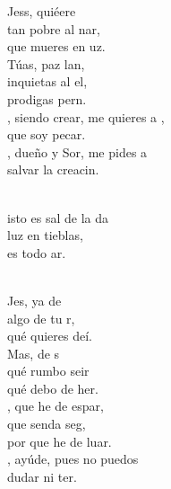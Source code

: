 \begin{cancion}%
	Jess, quiéere \\
	tan pobre al nar,\\
	que mueres en uz.\\
	Túas, paz  lan, \\
	inquietas al el,\\
	prodigas pern. \\
	, siendo crear, me quieres a , \\
	que soy pecar.\\
	, dueño y Sor, me pides a   \\
	salvar la creacin.\\\jump\\
	\begin{chorus}%
	isto es sal de la da\\
	luz en tieblas,\\
	es todo ar.\\
	\end{chorus}%
	\jump\\
	Jes, ya  de  \\
	algo de tu r,\\
	qué quieres deí.\\
	Mas,  de s\\
	qué rumbo seir\\
	qué debo de her.\\
	, que he de espar,\\
	que senda seg,\\
	por que he de luar.\\
	, ayúde, pues no puedos  \\
	dudar ni ter.\\
\end{cancion}%
